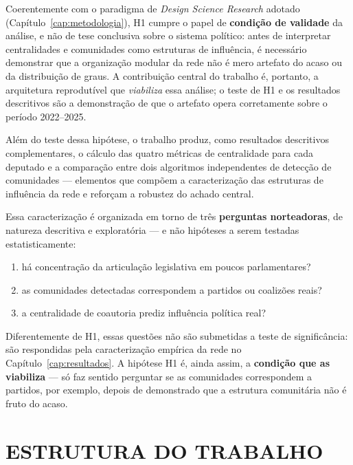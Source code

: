 \documentclass[
      12pt,
      a4paper,
      openright,
      oneside,
      chapter=TITLE,
      section=TITLE,
      english,
      french,
      spanish,
      brazilian
    ]{abntex2}
\begin{document}
    Coerentemente com o paradigma de \textit{Design Science Research} adotado (Capítulo~\ref{cap:metodologia}), H1 cumpre o papel de \textbf{condição de validade} da análise, e não de tese conclusiva sobre o sistema político: antes de interpretar centralidades e comunidades como estruturas de influência, é necessário demonstrar que a organização modular da rede não é mero artefato do acaso ou da distribuição de graus. A contribuição central do trabalho é, portanto, a arquitetura reprodutível que \textit{viabiliza} essa análise; o teste de H1 e os resultados descritivos são a demonstração de que o artefato opera corretamente sobre o período 2022--2025.
    
    Além do teste dessa hipótese, o trabalho produz, como resultados descritivos complementares, o cálculo das quatro métricas de centralidade para cada deputado e a comparação entre dois algoritmos independentes de detecção de comunidades --- elementos que compõem a caracterização das estruturas de influência da rede e reforçam a robustez do achado central.
    
    Essa caracterização é organizada em torno de três \textbf{perguntas norteadoras}, de natureza descritiva e exploratória --- e não hipóteses a serem testadas estatisticamente:
    
    \begin{enumerate}[label=(\roman*)]
        \item há concentração da articulação legislativa em poucos parlamentares?
        \item as comunidades detectadas correspondem a partidos ou coalizões reais?
        \item a centralidade de coautoria prediz influência política real?
    \end{enumerate}
    
    \noindent Diferentemente de H1, essas questões não são submetidas a teste de significância: são respondidas pela caracterização empírica da rede no Capítulo~\ref{cap:resultados}. A hipótese H1 é, ainda assim, a \textbf{condição que as viabiliza} --- só faz sentido perguntar se as comunidades correspondem a partidos, por exemplo, depois de demonstrado que a estrutura comunitária não é fruto do acaso.
    
    \section{ESTRUTURA DO TRABALHO}
    
\end{document}
